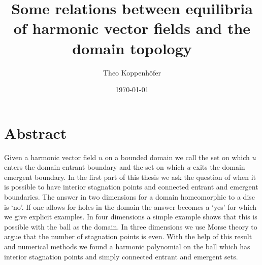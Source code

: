 








\title{Some relations between equilibria of harmonic vector fields and the domain topology}
\author{Theo Koppenhöfer}
\date{\today}


\graphicspath{{../Art/}}
\graphicspath{{../Plots/}}
\graphicspath{{../Figures/}}






\newcommand{\openX}{\interior\brk*{X}}







\setcounter{page}{-4}

\section*{Abstract}

Given a harmonic vector field $u$ on a bounded domain we call the set on which $u$ enters
the domain entrant boundary and the set on which $u$ exits the domain emergent boundary.
In the first part of this thesis we ask the question of 
when it is possible to have interior stagnation points and
connected entrant and emergent boundaries.
The answer in two dimensions for a domain homeomorphic to a disc is `no'.
If one allows for holes in the domain the answer becomes a `yes'
for which we give explicit examples.
In four dimensions a simple example shows that
this is possible with the ball as the domain.
In three dimensions we use Morse theory to argue that the number of
stagnation points is even. With the help of this result and numerical methods we found a harmonic
polynomial on the ball which has interior stagnation points and simply connected
entrant and emergent sets.

